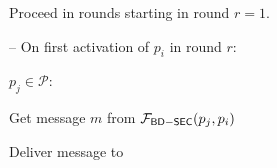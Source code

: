 %
%
%	
%
%
%
%
%
%
%
%
%
%
%
%
\begin{bbox}[title={\textbf{Wrapper} $\mathcal{W}_{\msf{synchronous}} (\mathcal{F})$}]

Proceed in rounds starting in round $r=1$.

-- On first activation of $p_i$ in round $r$:

	\qquad \For $p_j \in \mathcal{P}$:

		\qquad \quad Get message $m$ from $\mathcal{F}_{{\mathsf {BD-SEC}}}(p_j,p_i)$

		\qquad \quad Deliver message to \F


\end{bbox}

